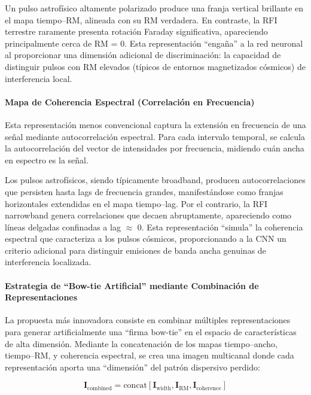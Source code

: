 Un pulso astrofísico altamente polarizado produce una franja vertical brillante en el mapa tiempo–RM, alineada con su RM verdadera. En contraste, la RFI terrestre raramente presenta rotación Faraday significativa, apareciendo principalmente cerca de RM = 0. Esta representación ``engaña'' a la red neuronal al proporcionar una dimensión adicional de discriminación: la capacidad de distinguir pulsos con RM elevados (típicos de entornos magnetizados cósmicos) de interferencia local.

\paragraph{Mapa de Coherencia Espectral (Correlación en Frecuencia)}

Esta representación menos convencional captura la extensión en frecuencia de una señal mediante autocorrelación espectral. Para cada intervalo temporal, se calcula la autocorrelación del vector de intensidades por frecuencia, midiendo cuán ancha en espectro es la señal.

Los pulsos astrofísicos, siendo típicamente broadband, producen autocorrelaciones que persisten hasta lags de frecuencia grandes, manifestándose como franjas horizontales extendidas en el mapa tiempo–lag. Por el contrario, la RFI narrowband genera correlaciones que decaen abruptamente, apareciendo como líneas delgadas confinadas a lag $\approx$ 0. Esta representación ``simula'' la coherencia espectral que caracteriza a los pulsos cósmicos, proporcionando a la CNN un criterio adicional para distinguir emisiones de banda ancha genuinas de interferencia localizada.

\paragraph{Estrategia de ``Bow-tie Artificial'' mediante Combinación de Representaciones}

La propuesta más innovadora consiste en combinar múltiples representaciones para generar artificialmente una ``firma bow-tie'' en el espacio de características de alta dimensión. Mediante la concatenación de los mapas tiempo–ancho, tiempo–RM, y coherencia espectral, se crea una imagen multicanal donde cada representación aporta una ``dimensión'' del patrón dispersivo perdido:

\[
\mathbf{I}_{\mathrm{combined}} = \mathrm{concat}[\mathbf{I}_{\mathrm{width}}, \mathbf{I}_{\mathrm{RM}}, \mathbf{I}_{\mathrm{coherence}}]
\]

